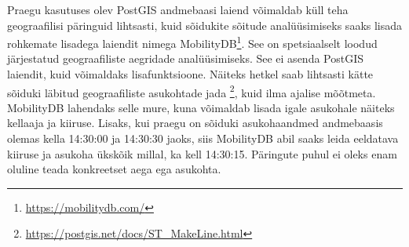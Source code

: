 Praegu kasutuses olev PostGIS andmebaasi laiend võimaldab küll teha geograafilisi päringuid lihtsasti, kuid sõidukite sõitude analüüsimiseks saaks lisada rohkemate lisadega laiendit nimega MobilityDB\footnote{\url{https://mobilitydb.com/}}. See on spetsiaalselt loodud järjestatud geograafiliste aegridade analüüsimiseks. See ei asenda PostGIS laiendit, kuid võimaldaks lisafunktsioone. Näiteks hetkel saab lihtsasti kätte sõiduki läbitud geograafiliste asukohtade jada \footnote{\url{https://postgis.net/docs/ST_MakeLine.html}}, kuid ilma ajalise mõõtmeta. MobilityDB lahendaks selle mure, kuna võimaldab lisada igale asukohale näiteks kellaaja ja kiiruse. Lisaks, kui praegu on sõiduki asukohaandmed andmebaasis olemas kella 14:30:00 ja  14:30:30 jaoks, siis MobilityDB abil saaks leida eeldatava kiiruse ja asukoha ükskõik millal, ka kell 14:30:15. Päringute puhul ei oleks enam oluline teada konkreetset aega ega asukohta.

